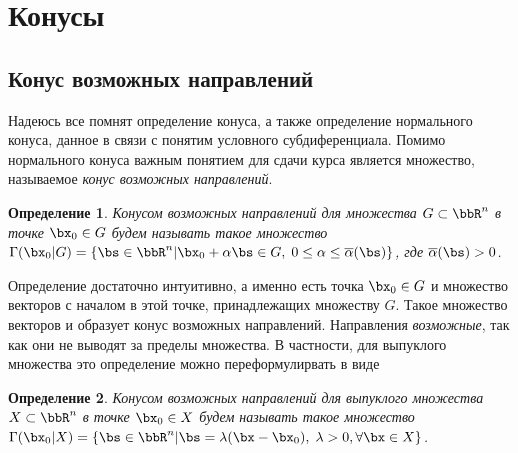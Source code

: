 \documentclass[12pt]{article}
\newtheorem{Def}{Определение}
\begin{document}
%

\section{Конусы}
\subsection{Конус возможных направлений}
Надеюсь все помнят определение конуса, а также определение нормального конуса, данное в связи с понятим условного субдиференциала.
Помимо нормального конуса важным понятием для сдачи курса является множество, называемое \emph{конус возможных направлений}.
\begin{Def}
Конусом возможных направлений для множества $G \subset \bbR^n$ в точке $\bx_0 \in G$ будем называть такое множество $\Gamma(\bx_0 | G) = \{ \bs \in \bbR^n | \bx_0 + \alpha\bs \in G, \; 0 \leq \alpha \leq \overline{\alpha}(\bs) \}$, где $\overline{\alpha}(\bs) > 0$.
\end{Def}
Определение достаточно интуитивно, а именно есть точка $\bx_0 \in G$ и множество векторов с началом в этой точке, принадлежащих множеству $G$.
Такое множество векторов и образует конус возможных направлений.
Направления \emph{возможные}, так как они не выводят за пределы множества.
В частности, для выпуклого множества это определение можно переформулирвать в виде
\begin{Def}
Конусом возможных направлений для выпуклого множества $X \subset \bbR^n$ в точке $\bx_0 \in X$ будем называть такое множество $\Gamma(\bx_0 | X) = \{ \bs \in \bbR^n | \bs = \lambda (\bx - \bx_0), \; \lambda > 0, \forall \bx \in X \}$.
\end{Def}
\end{document}
